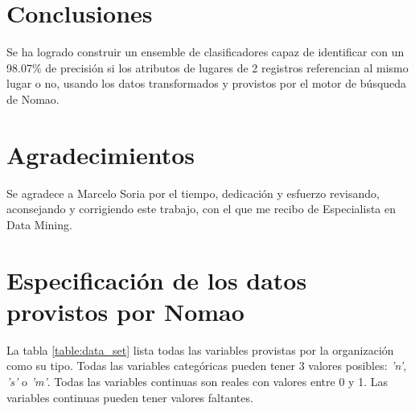 \documentclass[journal]{IEEEtran}
\begin{document}
\section{Conclusiones}
Se ha logrado construir un ensemble de clasificadores capaz de identificar
con un 98.07\% de precisión si los atributos de lugares de 2 registros
referencian al mismo lugar o no,
usando los datos transformados y provistos por el motor de búsqueda de Nomao.

\section*{Agradecimientos}
Se agradece a Marcelo Soria por el tiempo, dedicación y esfuerzo 
revisando, aconsejando y corrigiendo este trabajo, 
con el que me recibo de Especialista
en Data Mining.


\appendices

\section{Especificación de los datos provistos por Nomao}
\label{appendix1}
La tabla \ref{table:data_set} lista todas las variables provistas por la
organización como su tipo. Todas las variables 
categóricas pueden tener 3 valores posibles:
\textit{'n'}, \textit{'s'} o \textit{'m'}.
Todas las variables continuas son reales con valores entre 
0 y 1. Las variables continuas pueden tener valores faltantes.
\end{document}
